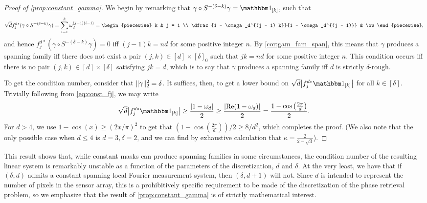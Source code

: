 \begin{proof}[Proof of \cref{prop:constant_gamma}]
  We begin by remarking that $\gamma \circ S^{-(\delta - k)} \gamma = \one_{[k]}$, such that \begin{equation} \sqrt{d} f_j^{d*} (\gamma \circ S^{-(\delta - k)} \gamma) = \sum_{i = 1}^k \omega_d^{(j - 1) (i - 1)} = \begin{piecewise} k & j = 1 \\ \dfrac{1 - \omega_d^{(j - 1) k}}{1 - \omega_d^{(j - 1)}} & \ow \end{piecewise}, \label{eq:const_fj}\end{equation} and hence $f_j^{d*}(\gamma \circ S^{- (\delta - k)} \gamma) = 0$ iff $(j - 1) k = n d$ for some positive integer $n$.  By \cref{cor:gam_fam_span}, this means that $\gamma$ produces a spanning family iff there does not exist a pair $(j, k) \in [d] \times [\delta]_0$ such that $j k = n d$ for some positive integer $n$.  This condition occurs iff there is no pair $(j, k) \in [d] \times [\delta]$ satisfying $j k = d$, which is to say that $\gamma$ produces a spanning family iff $d$ is strictly $\delta$-rough.

  To get the condition number, consider that $\lVert\gamma\rVert_2^2 = \delta$.  It suffices, then, to get a lower bound on $\sqrt{d} \abs*{f_j^{d*} \one_{[k]}}$ for all $k \in [\delta]$.   Trivially following from \eqref{eq:const_fj}, we may write \[\sqrt{d} \abs*{f_j^{d*} \one_{[k]}} \ge \dfrac{\abs{1 - \omega_d}}{2} \ge \dfrac{\abs{\Re(1 - \omega_d)}}{2} = \dfrac{1 - \cos\left(\frac{2 \pi}{d}\right)}{2}.\]  For $d > 4$, we use $1 - \cos(x) \ge (2 x / \pi)^2$ to get that $(1 - \cos(\frac{2 \pi}{d})) / 2 \ge 8 / d^2$, which completes the proof.  (We also note that the only possible case when $d \le 4$ is $d = 3, \delta = 2$, and we can find by exhaustive calculation that $\kappa = \frac{2}{2 - \sqrt{3}}$).
\end{proof}

This result shows that, while constant masks can produce spanning families in some circumstances, the condition number of the resulting linear system is remarkably unstable as a function of the parameters of the discretization, $d$ and $\delta$.  At the very least, we have that if $(\delta, d)$ admits a constant spanning local Fourier measurement system, then $(\delta, d + 1)$ will not.  Since $d$ is intended to represent the number of pixels in the sensor array, this is a prohibitively specific requirement to be made of the discretization of the phase retrieval problem, so we emphasize that the result of \cref{prop:constant_gamma} is of strictly mathematical interest.
